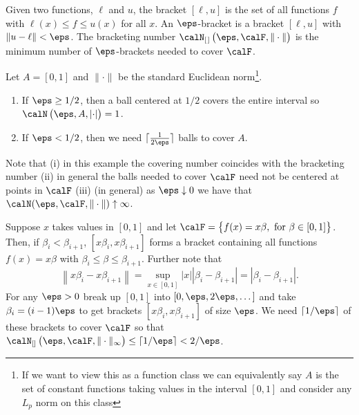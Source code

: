 \begin{definition}
	\label{def:bracketing}
	Given two functions, \(\ell\) and \(u\), the bracket \([\ell,u]\) is the set of all functions  \(f\) with  \(\ell(x)\leq f\leq u(x)\) for all \(x\). An  \(\eps\)-bracket is a bracket  \([\ell,u]\) with  \(\|u-\ell\|< \eps\). The bracketing number \(\calN_{[\hspace{0.1em}]}\left(\eps,\calF,\|\cdot\|\right)\) is the minimum number of \(\eps\)-brackets needed to cover  \(\calF\).
\end{definition}

\begin{example}
	\label{ex:covering}
	Let \(A = [0,1]\) and  \(\|\cdot\|\) be the standard Euclidean norm\footnote{If we want to view this as a function class we can equivalently say \(A\) is the set of constant functions taking values in the interval  \([0,1]\) and consider any \(L_p\) norm on this class}.
	\begin{enumerate}
		\item If \(\eps \geq 1/2\), then a ball centered at  \(1/2\) covers the entire interval so  \(\calN\left(\eps,A,\left|\cdot\right|\right) = 1\).
		\item If \(\eps < 1/2\), then we need \(\lceil \frac{1}{2\eps}\rceil\) balls to cover \(A\).
	\end{enumerate}
	Note that (i) in this example the covering number coincides with the bracketing number (ii) in general the balls needed to cover \(\calF\) need not be centered at points in \(\calF\) (iii) (in general) as \(\eps\downarrow 0\) we have that  \(\calN(\eps,\calF,\|\cdot\|)\uparrow\infty\). 
\end{example}

\begin{example}
	\label{ex:brackering}
	Suppose \(x\) takes values in  \([0,1]\) and let \(\calF = \left\{f(x)=x\beta,\text{ for }\beta \in [0,1]\right\}\). Then, if \(\beta_i < \beta_{i+1}\),  \([x\beta_i, x\beta_{i+1}]\) forms a bracket containing all functions  \(f(x)=x\beta\) with  \(\beta_i \leq \beta\leq \beta_{i+1}\). Further note that \[
		\left\|x\beta_i - x\beta_{i+1}\right\| = \sup_{x\in[0,1]}|x||\beta_i-\beta_{i+1}| = |\beta_i -\beta_{i+1}|
	.\] 
	For any \(\eps>0\) break up  \([0,1]\) into  \([0,\eps,2\eps,\dots]\) and take \(\beta_i = (i-1)\eps\) to get brackets  \([x\beta_i,x\beta_{i+1}]\) of size \(\eps\). We need  \(\lceil 1/\eps\rceil\) of these brackets to cover  \(\calF\) so that  \(\calN_{[]}\left(\eps,\calF,\|\cdot\|_\infty\right)\leq \lceil 1/\eps\rceil < 2/\eps\).
\end{example}


